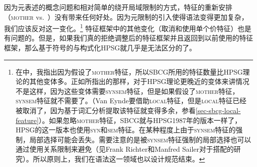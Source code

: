 因为元表述的概念问题和相对简单的绕开局域限制的方式，特征的重新安排 （\textsc{mother} vs.\ \synsemc）没有带来任何好处。因为元限制的引入使得语法变得更加复杂，我们应该反对这一变化。\footnote{
  在中，我指出因为假设了\textsc{mother}特征，所以SBCG所用的特征数量比HPSG理论的其他变体多。正如\citet{VanEynde2015a}所指出的那样，对于HPSG理论更晚近的变体来讲情况不是这样，因为这些变体需要\textsc{synsem}特征，但是如果假设了\textsc{mother}特征，\textsc{synsem}特征就不需要了。（Van Eynde要借助\textsc{local}特征，但是\textsc{local}特征已经被取消了，因为基于词汇分析提取该特征就变得多余，参看\ref{sec-sbcg-local-feature}）。如果忽略\textsc{mother}特征，SBCG就与HPSG1987年的版本\citep{ps}一样了，HPSG的这一版本也使用\textsc{syn}和\textsc{sem}特征。在某种程度上由于\textsc{synsem}特征的强制，局部选择可能会丢失\citep[]{Sag2012a}。需要注意的是被\textsc{synsem}特征强制的局部选择也可以通过使用关系限制来避免（见Frank Richter和Manfred Sailer对于搭配的研究\citep{RS99b-u,SS2003a}）。所以原则上，我们在语法这一领域也以设计规范结束。%
} 特征框架中的其他变化（取消\localfc 和使用单个价特征）也是有问题的。但是，如果我们真的拒绝调整后的特征框架并且返回到以前使用的特征框架，那么基于符号的\sbcgc 与构式化HPSG\citep{Sag97a}就几乎是无法区分的了。


